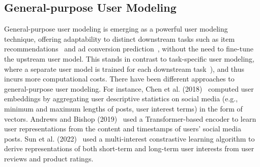 \documentclass{article}
\begin{document}
\subsection{General-purpose User Modeling}
General-purpose user modeling is emerging as a powerful user modeling technique, offering adaptability to distinct downstream tasks such as item recommendations~\citep{chen_predictive_2018} and ad conversion prediction~\citep{wu_ptum_2020}, without the need to fine-tune the upstream user model. This stands in contrast to task-specific user modeling, where a separate user model is trained for each downstream task~\cite[e.g.,][]{modell_graph_2021, fan2019graph,waller_generalists_2019,zheng2017joint,liu2010personalized}), and thus incurs more computational costs.
There have been different approaches to general-purpose user modeling. For instance, Chen et al. (2018)~\citep{chen_forum_2018} computed user embeddings by aggregating user descriptive statistics on social media (e.g., minimum and maximum lengths of posts, user interest terms) in the form of vectors. 
Andrews and Bishop (2019)~\citep{andrews_learning_2019} used a Transformer-based encoder to learn user representations from the content and timestamps of users' social media posts. Sun et al. (2022)~\citep{sun2022learning} used a multi-interest constrastive learning algorithm to derive representations of both short-term and long-term user interests from user reviews and product ratings. 
\end{document}
